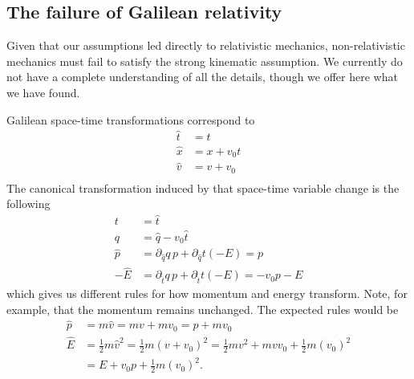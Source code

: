 \subsection{The failure of Galilean relativity}

Given that our assumptions led directly to relativistic mechanics, non-relativistic mechanics must fail to satisfy the strong kinematic assumption. We currently do not have a complete understanding of all the details, though we offer here what we have found.

Galilean space-time transformations correspond to
\begin{equation}
	\begin{aligned}
		\hat{t} &= t \\
		\hat{x} &= x + v_0 t \\
		\hat{v} &= v + v_0 \\
	\end{aligned}
\end{equation}
The canonical transformation induced by that space-time variable change is the following
\begin{equation}
	\begin{aligned}
		t &= \hat{t} \\
		q &= \hat{q} - v_0 \hat{t} \\
		\hat{p} &= \partial_{\hat{q}} q \, p  + \partial_{\hat{q}} t (-E) = p \\
		-\hat{E} &= \partial_{\hat{t}} q \, p  + \partial_{\hat{t}} t (-E) = - v_0 p - E 
	\end{aligned}
\end{equation}
which gives us different rules for how momentum and energy transform. Note, for example, that the momentum remains unchanged. The expected rules would be
\begin{equation}
	\begin{aligned}
		\hat{p} &= m\hat{v} = mv + mv_0 = p + m v_0 \\
		\hat{E} &= \frac{1}{2} m \hat{v}^2 = \frac{1}{2} m (v + v_0)^2 = \frac{1}{2} m v^2 + m v  v_0 + \frac{1}{2} m (v_0)^2 \\
		&= E + v_0 p + \frac{1}{2} m (v_0)^2.
	\end{aligned}
\end{equation}

